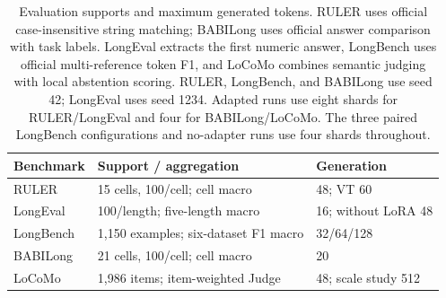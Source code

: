 \begin{table}[htbp]
\centering
\small
\setlength{\tabcolsep}{4pt}
\begin{tabular}{@{}lll@{}}
\toprule
Benchmark & Support / aggregation & Generation \\
\midrule
RULER & 15 cells, 100/cell; cell macro & 48; VT 60 \\
LongEval & 100/length; five-length macro & 16; without LoRA 48 \\
LongBench & 1,150 examples; six-dataset F1 macro & 32/64/128 \\
BABILong & 21 cells, 100/cell; cell macro & 20 \\
LoCoMo & 1,986 items; item-weighted Judge & 48; scale study 512 \\
\bottomrule
\end{tabular}
\caption{Evaluation supports and maximum generated tokens. RULER uses official case-insensitive string matching; BABILong uses official answer comparison with task labels. LongEval extracts the first numeric answer, LongBench uses official multi-reference token F1, and LoCoMo combines semantic judging with local abstention scoring. RULER, LongBench, and BABILong use seed 42; LongEval uses seed 1234. Adapted runs use eight shards for RULER/LongEval and four for BABILong/LoCoMo. The three paired LongBench configurations and no-adapter runs use four shards throughout.}
\label{tab:eval}
\end{table}
